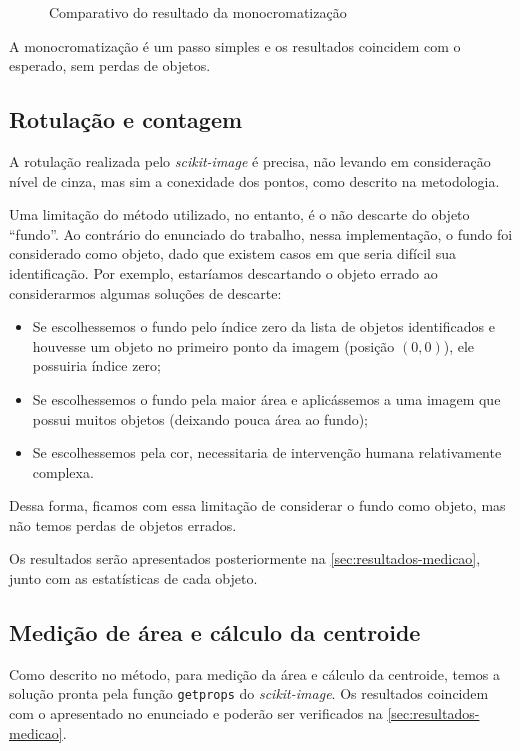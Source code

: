 \documentclass[brazilian,a4paper,twocolumn]{article}
\begin{document}
\begin{figure}[H]
            \caption{Comparativo do resultado da monocromatização}
            \label{fig:monocromatizacao}
        \end{figure}

        A monocromatização é um passo simples e os resultados coincidem com o esperado, sem perdas de objetos.

    \subsection{Rotulação e contagem}

        A rotulação realizada pelo \emph{scikit-image} é precisa, não levando em consideração nível de cinza, mas sim a conexidade dos pontos, como descrito na metodologia.

        Uma limitação do método utilizado, no entanto, é o não descarte do objeto ``fundo''. Ao contrário do enunciado do trabalho, nessa implementação, o fundo foi considerado como objeto, dado que existem casos em que seria difícil sua identificação. Por exemplo, estaríamos descartando o objeto errado ao considerarmos algumas soluções de descarte:
        \begin{itemize}
            \item Se escolhessemos o fundo pelo índice zero da lista de objetos identificados e houvesse um objeto no primeiro ponto da imagem (posição $(0, 0)$), ele possuiria índice zero;
            \item Se escolhessemos o fundo pela maior área e aplicássemos a uma imagem que possui muitos objetos (deixando pouca área ao fundo);
            \item Se escolhessemos pela cor, necessitaria de intervenção humana relativamente complexa.
        \end{itemize}

        Dessa forma, ficamos com essa limitação de considerar o fundo como objeto, mas não temos perdas de objetos errados.

        Os resultados serão apresentados posteriormente na \cref{sec:resultados-medicao}, junto com as estatísticas de cada objeto.

    \subsection{Medição de área e cálculo da centroide}

        Como descrito no método, para medição da área e cálculo da centroide, temos a solução pronta pela função \texttt{getprops} do \emph{scikit-image}. Os resultados coincidem com o apresentado no enunciado e poderão ser verificados na \cref{sec:resultados-medicao}.
\end{document}
